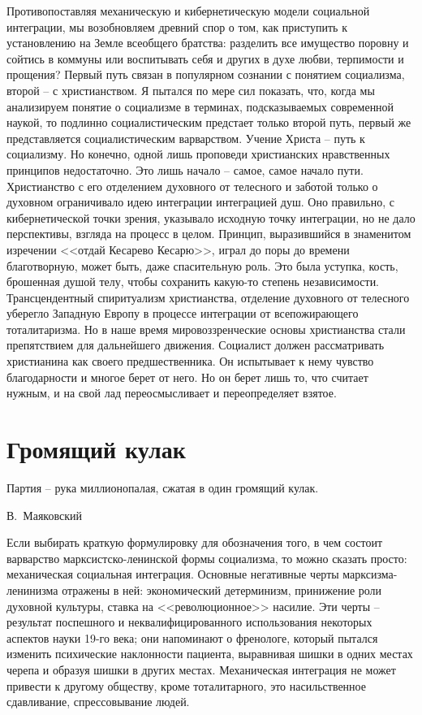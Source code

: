 \documentclass{book}
\begin{document}
Противопоставляя механическую и кибернетическую моде­ли социальной интеграции, мы возобновляем древний спор о том, как приступить к установлению на Земле всеобщего братст­ва: разделить все имущество поровну и сойтись в коммуны или воспитывать себя и других в духе любви, терпимости и про­щения? Первый путь связан в популярном сознании с понятием социализма, второй -- с христианством. Я пытался по мере сил показать, что, когда мы анализируем понятие о социализме в терминах, подсказываемых современной наукой, то подлинно социалистическим предстает только второй путь, первый же представляется социалистическим варварством. Учение Христа -- путь к социализму. Но конечно, одной лишь проповеди хри­стианских нравственных принципов недостаточно. Это лишь на­чало -- самое, самое начало пути. Христианство с его отделением духовного от телесного и заботой только о духовном ограничи­вало идею интеграции интеграцией душ. Оно правильно, с кибернетической точки зрения, указывало исходную точку интег­рации, но не дало 
перспективы, взгляда на процесс в целом. Принцип, выразившийся в знаменитом изречении <<отдай Кесарево Кесарю>>, играл до поры до времени благотворную, может быть, даже спасительную роль. Это была уступка, кость, брошен­ная душой телу, чтобы сохранить какую-то степень независимости. Трансцендентный спиритуализм христианства, отделе­ние духовного от телесного уберегло Западную Европу в про­цессе интеграции от всепожирающего тоталитаризма. Но в наше время мировоззренческие основы христианства стали препятствием для дальнейшего движения. Социалист должен рассматривать христианина как своего предшественника. Он испытывает к нему чувство благодарности и многое берет от него. Но он берет лишь то, что считает нужным, и на свой лад переосмысливает и переопределяет взятое.


\section{Громящий кулак}

\epigraph{Партия -- рука миллионопалая, сжатая в один громящий кулак.}{В.~Маяковский%
}

Если выбирать краткую формулировку для обозначения того, в чем состоит варварство марксистско-ленинской формы социализма, то можно сказать просто: механическая социаль­ная интеграция. Основные негативные черты марксизма-лени­низма отражены в ней: экономический детерминизм, прини­жение роли духовной культуры, ставка на <<революционное>> насилие. Эти черты -- результат поспешного и неквалифици­рованного использования некоторых аспектов науки 19-го ве­ка; они напоминают о френологе, который пытался изменить психические наклонности пациента, выравнивая шишки в одних местах черепа и образуя шишки в других местах. Механиче­ская интеграция не может привести к другому обществу, кроме тоталитарного, это насильственное сдавливание, спрессовыва­ние людей.
\end{document}
